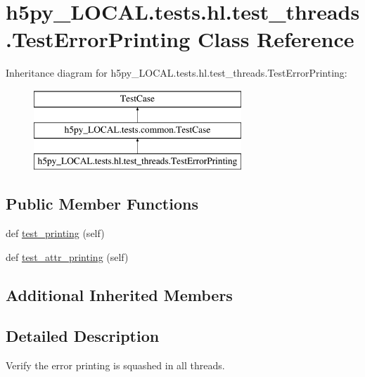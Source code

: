 \hypertarget{classh5py__LOCAL_1_1tests_1_1hl_1_1test__threads_1_1TestErrorPrinting}{}\section{h5py\+\_\+\+L\+O\+C\+A\+L.\+tests.\+hl.\+test\+\_\+threads.\+Test\+Error\+Printing Class Reference}
\label{classh5py__LOCAL_1_1tests_1_1hl_1_1test__threads_1_1TestErrorPrinting}
Inheritance diagram for h5py\+\_\+\+L\+O\+C\+A\+L.\+tests.\+hl.\+test\+\_\+threads.\+Test\+Error\+Printing\+:\begin{figure}[H]
\begin{center}
\leavevmode
\includegraphics[height=3.000000cm]{classh5py__LOCAL_1_1tests_1_1hl_1_1test__threads_1_1TestErrorPrinting}
\end{center}
\end{figure}
\subsection*{Public Member Functions}
\begin{DoxyCompactItemize}
\item 
def \hyperlink{classh5py__LOCAL_1_1tests_1_1hl_1_1test__threads_1_1TestErrorPrinting_a11d59f8453271d44adfa4ee5549dda6b}{test\+\_\+printing} (self)
\item 
def \hyperlink{classh5py__LOCAL_1_1tests_1_1hl_1_1test__threads_1_1TestErrorPrinting_add25037ccf3a358556159834a26c04d8}{test\+\_\+attr\+\_\+printing} (self)
\end{DoxyCompactItemize}
\subsection*{Additional Inherited Members}


\subsection{Detailed Description}
\begin{DoxyVerb}    Verify the error printing is squashed in all threads.
\end{DoxyVerb}
 

